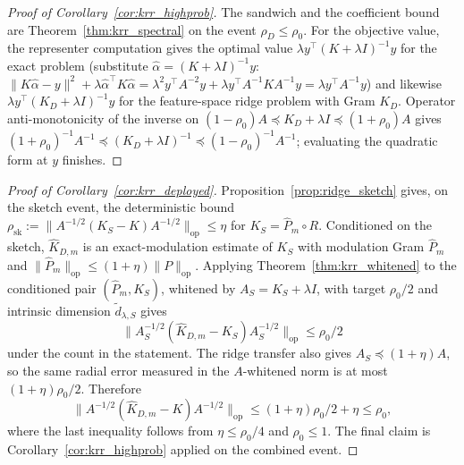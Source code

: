 \documentclass{article}
\begin{document}
\begin{proof}[Proof of Corollary~\ref{cor:krr_highprob}]
The sandwich and the coefficient bound are Theorem~\ref{thm:krr_spectral} on the event $\rho_D\le\rho_0$. For the objective value, the representer computation gives the optimal value $\lambda y^\top(K+\lambda I)^{-1}y$ for the exact problem (substitute $\hat\alpha=(K+\lambda I)^{-1}y$: $\|K\hat\alpha-y\|^2+\lambda\hat\alpha^\top K\hat\alpha=\lambda^2y^\top A^{-2}y+\lambda y^\top A^{-1}KA^{-1}y=\lambda y^\top A^{-1}y$) and likewise $\lambda y^\top(K_D+\lambda I)^{-1}y$ for the feature-space ridge problem with Gram $K_D$. Operator anti-monotonicity of the inverse on $(1-\rho_0)A\preceq K_D+\lambda I\preceq(1+\rho_0)A$ gives $(1+\rho_0)^{-1}A^{-1}\preceq(K_D+\lambda I)^{-1}\preceq(1-\rho_0)^{-1}A^{-1}$; evaluating the quadratic form at $y$ finishes.
\end{proof}

\begin{proof}[Proof of Corollary~\ref{cor:krr_deployed}]
Proposition~\ref{prop:ridge_sketch} gives, on the sketch event, the deterministic bound $\rho_{\mathrm{sk}}:=\|A^{-1/2}(K_S-K)A^{-1/2}\|_{\mathrm{op}}\le\eta$ for $K_S=\widehat P_m\circ R$. Conditioned on the sketch, $\widehat K_{D,m}$ is an exact-modulation estimate of $K_S$ with modulation Gram $\widehat P_m$ and $\|\widehat P_m\|_{\mathrm{op}}\le(1+\eta)\|P\|_{\mathrm{op}}$. Applying Theorem~\ref{thm:krr_whitened} to the conditioned pair $(\widehat P_m,K_S)$, whitened by $A_S=K_S+\lambda I$, with target $\rho_0/2$ and intrinsic dimension $\tilde d_{\lambda,S}$ gives
\[
\bigl\|A_S^{-1/2}(\widehat K_{D,m}-K_S)A_S^{-1/2}\bigr\|_{\mathrm{op}}\le\rho_0/2
\]
under the count in the statement. The ridge transfer also gives $A_S\preceq(1+\eta)A$, so the same radial error measured in the $A$-whitened norm is at most $(1+\eta)\rho_0/2$. Therefore
\[
\bigl\|A^{-1/2}(\widehat K_{D,m}-K)A^{-1/2}\bigr\|_{\mathrm{op}}
\le (1+\eta)\rho_0/2+\eta \le \rho_0,
\]
where the last inequality follows from $\eta\le\rho_0/4$ and $\rho_0\le1$. The final claim is Corollary~\ref{cor:krr_highprob} applied on the combined event.
\end{proof}
\end{document}

